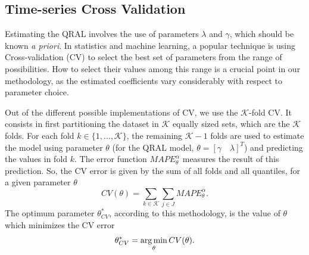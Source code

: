 \subsection{Time-series Cross Validation} \label{sec:cv}

Estimating the QRAL involves the use of parameters $\lambda$ and $\gamma$, which should be known \textit{a priori}. In statistics and machine learning, a popular technique is using Cross-validation (CV) to select the best set of parameters from the range of possibilities. How to select their values among this range is a crucial point in our methodology, as the estimated coefficients vary considerably with respect to parameter choice.

Out of the different possible implementations of CV, we use the $\mathcal{K}$-fold CV. It consists in first partitioning the dataset in $\mathcal{K}$ equally sized sets, which are the $\mathcal{K}$ folds. For each fold $k \in \{1,\dots,\mathcal{K}\}$, the remaining $\mathcal{K}-1$ folds are used to estimate the model using parameter $\theta$ (for the QRAL model, $\theta = [\gamma \quad \lambda]^T$) and predicting the values in fold $k$. The error function $MAPE^\alpha_\theta$ measures the result of this prediction.
So, the CV error is given by the sum of all folds and all quantiles, for a given parameter $\theta$
\[
 CV(\theta) = \sum_{k \in \mathcal{K}} \sum_{j \in J} MAPE^\alpha_\theta.\label{eq:cv-error}
\]
The optimum parameter $\theta^*_{CV}$, according to this methodology, is the value of $\theta$ which minimizes the CV error
\begin{equation}
\theta_{CV}^* = \argmin_\theta CV(\theta) .\label{eq:cv-equation}
\end{equation}

